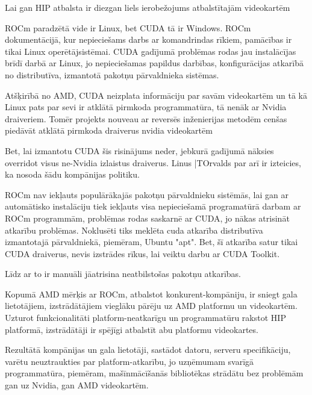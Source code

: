 \documentclass[12pt]{report}%
\theoremstyle{definition}
\begin{document}
Lai gan HIP atbalsta ir diezgan liels ierobežojums atbalstītajām videokartēm




ROCm paradzētā vide ir Linux, bet CUDA tā ir Windows. ROCm dokumentācijā, kur nepieciešams darbs ar komandrindas rīkiem, pamācības ir tikai Linux operētājsistēmai. CUDA gadījumā problēmas rodas jau instalācījas brīdī darbā ar Linux, jo nepieciešamas papildus darbības, konfigurācijas atkarībā no distributīva, izmantotā pakotņu pārvaldnieka sistēmas.

Atšķirībā no AMD, CUDA neizplata informāciju par savām videokartēm un tā kā Linux pats par sevi ir atklātā
pirmkoda programmatūra, tā nenāk ar Nvidia draiveriem. Tomēr projekts nouveau ar reversēs inženierijas
metodēm cenšas piedāvāt atklātā pirmkoda draiverus nvidia videokartēm

Bet, lai izmantotu CUDA šis risinājums neder, jebkurā gadījumā nāksies overridot visus ne-Nvidia izlaistus draiverus. Linus |TOrvalds par arī ir izteicies, ka nosoda šādu kompānijas politiku.





ROCm nav iekļauts populārākajās pakotņu pārvaldnieku sistēmās, lai gan ar automātisko instalāciju 
tiek iekļauts visa nepieciešamā programatūrā darbam ar ROCm programmām, problēmas rodas saskarnē ar
CUDA, jo nākas atrisināt atkarību problēmas. Noklusēti tiks meklēta cuda atkarība distributīva izmantotajā
pārvaldniekā, piemēram, Ubuntu "apt". Bet, šī atkarība satur tikai CUDA draiverus, nevis 
izstrādes rīkus, lai veiktu darbu ar CUDA Toolkit. 

Līdz ar to ir manuāli jāatrisina neatbilstošas pakotņu atkarības.






Kopumā AMD mērķis ar ROCm, atbalstot konkurent-kompāniju, ir sniegt gala lietotājiem, izstrādātājiem
vieglāku pārēju uz AMD platformu un videokartēm. Uzturot funkcionalitāti platform-neatkarīgu un
programmatūru rakstot HIP platformā, izstrādātāji ir spējīgi atbalstīt abu platformu videokartes.

Rezultātā kompānijas un gala lietotāji, sastādot datoru, serveru specifikāciju, varētu neuztraukties
par platform-atkarību, jo uzņēmumam svarīgā programmatūra, piemēram, mašīnmācīšanās bibliotēkas
strādātu bez problēmām gan uz Nvidia, gan AMD videokartēm.
\end{document}
